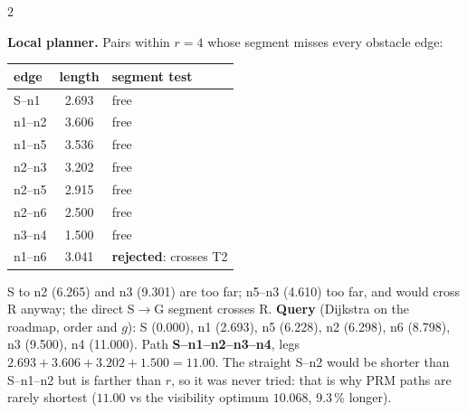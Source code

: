 \begin{multicols}{2}
\begin{worked}[SOLVED SAMPLE 6a: one PRM build and query on the practical map, $r=4$]
\textbf{Local planner.} Pairs within $r=4$ whose segment misses every obstacle edge:\par\vspace{1pt}
\scriptsize\setlength{\tabcolsep}{3pt}
\begin{tabularx}{\linewidth}{@{}lcX@{}}\toprule
edge & length & segment test\\\midrule
S--n1 & 2.693 & free\\
n1--n2 & 3.606 & free\\
n1--n5 & 3.536 & free\\
n2--n3 & 3.202 & free\\
n2--n5 & 2.915 & free\\
n2--n6 & 2.500 & free\\
n3--n4 & 1.500 & free\\
n1--n6 & 3.041 & \textbf{rejected}: crosses T2\\
\bottomrule\end{tabularx}\par\vspace{2pt}\small
S to n2 (6.265) and n3 (9.301) are too far; n5--n3 (4.610) too far, and would cross R anyway; the direct S$\to$G segment crosses R. \textbf{Query} (Dijkstra on the roadmap, order and $g$): S (0.000), n1 (2.693), n5 (6.228), n2 (6.298), n6 (8.798), n3 (9.500), n4 (11.000). Path \textbf{S--n1--n2--n3--n4}, legs $2.693+3.606+3.202+1.500=\mathbf{11.00}$. The straight S--n2 would be shorter than S--n1--n2 but is farther than $r$, so it was never tried: that is why PRM paths are rarely shortest ($11.00$ vs the visibility optimum $10.068$, 9.3\,\% longer). \chk
\end{worked}


\end{multicols}
